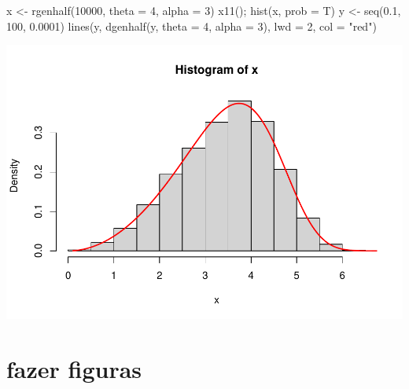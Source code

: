 \documentclass[
]{article}
\newenvironment{Shaded}{\begin{snugshade}}{\end{snugshade}}
\newcommand{\AttributeTok}[1]{\textcolor[rgb]{0.77,0.63,0.00}{#1}}
\newcommand{\DecValTok}[1]{\textcolor[rgb]{0.00,0.00,0.81}{#1}}
\newcommand{\FloatTok}[1]{\textcolor[rgb]{0.00,0.00,0.81}{#1}}
\newcommand{\FunctionTok}[1]{\textcolor[rgb]{0.00,0.00,0.00}{#1}}
\newcommand{\NormalTok}[1]{#1}
\newcommand{\OtherTok}[1]{\textcolor[rgb]{0.56,0.35,0.01}{#1}}
\newcommand{\StringTok}[1]{\textcolor[rgb]{0.31,0.60,0.02}{#1}}
\begin{document}
\begin{Shaded}
\begin{Highlighting}[]
\NormalTok{x }\OtherTok{\textless{}{-}} \FunctionTok{rgenhalf}\NormalTok{(}\DecValTok{10000}\NormalTok{, }\AttributeTok{theta =} \DecValTok{4}\NormalTok{, }\AttributeTok{alpha =} \DecValTok{3}\NormalTok{)}
\FunctionTok{x11}\NormalTok{(); }\FunctionTok{hist}\NormalTok{(x, }\AttributeTok{prob =}\NormalTok{ T)}
\NormalTok{y }\OtherTok{\textless{}{-}} \FunctionTok{seq}\NormalTok{(}\FloatTok{0.1}\NormalTok{, }\DecValTok{100}\NormalTok{, }\FloatTok{0.0001}\NormalTok{)}
\FunctionTok{lines}\NormalTok{(y, }\FunctionTok{dgenhalf}\NormalTok{(y, }\AttributeTok{theta =} \DecValTok{4}\NormalTok{, }\AttributeTok{alpha =} \DecValTok{3}\NormalTok{), }\AttributeTok{lwd =} \DecValTok{2}\NormalTok{, }\AttributeTok{col =} \StringTok{"red"}\NormalTok{)}
\end{Highlighting}
\end{Shaded}

\includegraphics{code_files/figure-latex/unnamed-chunk-5-1.pdf}

\hypertarget{fazer-figuras}{%
\section{fazer figuras}\label{fazer-figuras}}
\end{document}
